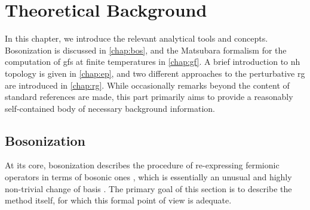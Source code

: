 \chapter{Theoretical Background}\label{chap:back}
In this chapter, we introduce the relevant analytical tools and concepts.
Bosonization is discussed in \autoref{chap:bos}, and the Matsubara formalism for the computation of \acrlong{gf}s at finite temperatures in \autoref{chap:gf}.
A brief introduction to \acrlong{nh} topology is given in \autoref{chap:ep}, and two different approaches to the perturbative \acrlong{rg} are introduced in \autoref{chap:rg}.
While occasionally remarks beyond the content of standard references are made, this part primarily aims to provide a reasonably self-contained body of necessary background information.
\section{Bosonization}\label{chap:bos}
At its core, bosonization describes the procedure of re-expressing fermionic operators in terms of bosonic ones \cites[\ssec II]{Bosonization_FiniteT_Bowen_2001}[\ssec 3.I]{Gogolin_1999}, which is essentially an unusual and highly non-trivial change of basis \cites[]{Giamarchi_2004}.
The primary goal of this section is to describe the method itself, for which this formal point of view is adequate.
